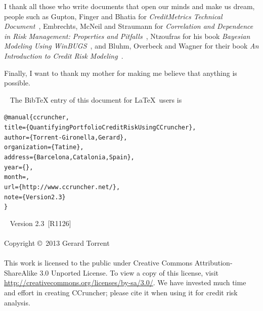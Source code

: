 \documentclass[11pt,fleqn]{book} %
\def\numversion{2.3}
\def\svnversion{R1126}
\begin{document}
I thank all those who write documents that open our minds and make us dream,
people such as Gupton, Finger and Bhatia for \emph{CreditMetrics Technical 
Document}~\cite{cmetrics:1997}, Embrechts, McNeil and Straumann for
\emph{Correlation and Dependence in Risk Management: Properties and 
Pitfalls}~\cite{embrechts:2002}, Ntzoufras for his book \emph{Bayesian Modeling 
Using WinBUGS}~\cite{ntzoufras:2009}, and Bluhm, Overbeck and Wagner for their 
book \emph{An Introduction to Credit Risk Modeling}~\cite{bluhm:2002}.

Finally, I want to thank my mother for making me believe that anything is 
possible.


~\vfill
The BibTeX entry of this document for \LaTeX\ users is
\begin{alltt}
@manual\{ccruncher,
    title = \{Quantifying Portfolio Credit Risk Using CCruncher\},
    author = \{Torrent-Gironella, Gerard\},
    organization = \{Tatine\},
    address = \{Barcelona, Catalonia, Spain\},
    year = \{\the\year\}, 
    month = \shortmonthname,
    url = \{http://www.ccruncher.net/\},
    note = \{Version \numversion\}
\}
\end{alltt}

~\vfill
\thispagestyle{empty}
\noindent Version \numversion\ [\svnversion]\\ 
\\
\noindent Copyright \copyright\ 2013 Gerard Torrent\\
\\
\noindent 
This work is licensed to the public under Creative Commons 
Attribution-ShareAlike 3.0 Unported License. To view a copy 
of this license, visit 
\url{http://creativecommons.org/licenses/by-sa/3.0/}.
We have invested much time and effort in creating CCruncher; 
please cite it when using it for credit risk analysis.


\pagestyle{empty}
\setcounter{tocdepth}{1}
\tableofcontents
\cleardoublepage
\pagestyle{fancy}
\end{document}
